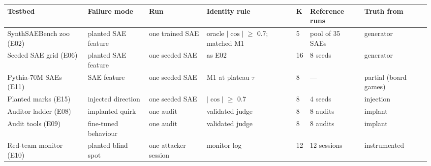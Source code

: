\begin{tabular}{lllllll}
\toprule
Testbed & Failure mode & Run & Identity rule & K & Reference runs & Truth from \\
\midrule
SynthSAEBench zoo (E02) & planted SAE feature & one trained SAE & oracle $|\cos|$ $\geq$ 0.7; matched M1 & 5 & pool of 35 SAEs & generator \\
Seeded SAE grid (E06) & planted SAE feature & one seeded SAE & as E02 & 16 & 8 seeds & generator \\
Pythia-70M SAEs (E11) & SAE feature & one seeded SAE & M1 at plateau $\tau$ & 8 & — & partial (board games) \\
Planted marks (E15) & injected direction & one seeded SAE & $|\cos|$ $\geq$ 0.7 & 8 & 4 seeds & injection \\
Auditor ladder (E08) & implanted quirk & one audit & validated judge & 8 & 8 audits & implant \\
Audit tools (E09) & fine-tuned behaviour & one audit & validated judge & 8 & 8 audits & implant \\
Red-team monitor (E10) & planted blind spot & one attacker session & monitor log & 12 & 12 sessions & instrumented \\
\bottomrule
\end{tabular}
